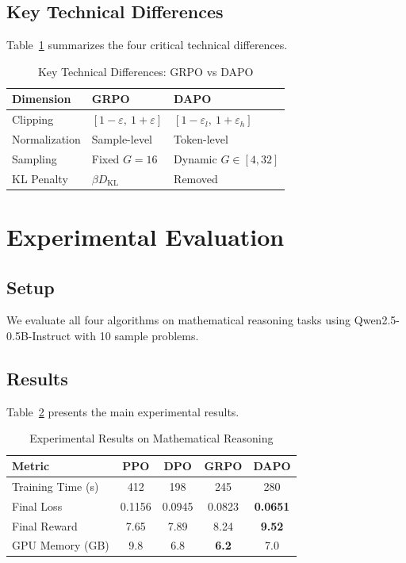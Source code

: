 \documentclass[10pt,twocolumn]{article}
\begin{document}
\subsection{Key Technical Differences}

Table~\ref{tab:tech} summarizes the four critical technical differences.

\begin{table}[ht]
\centering
\caption{Key Technical Differences: GRPO vs DAPO}
\label{tab:tech}
\begin{tabular}{lll}
\toprule
\textbf{Dimension} & \textbf{GRPO} & \textbf{DAPO} \\
\midrule
Clipping & $[1{-}\varepsilon,\ 1{+}\varepsilon]$ & $[1{-}\varepsilon_l,\ 1{+}\varepsilon_h]$ \\
Normalization & Sample-level & Token-level \\
Sampling & Fixed $G{=}16$ & Dynamic $G{\in}[4,32]$ \\
KL Penalty & $\beta D_{\text{KL}}$ & Removed \\
\bottomrule
\end{tabular}
\end{table}

\section{Experimental Evaluation}
\label{sec:exp}

\subsection{Setup}

We evaluate all four algorithms on mathematical reasoning tasks using Qwen2.5-0.5B-Instruct with 10 sample problems.

\subsection{Results}

Table~\ref{tab:results} presents the main experimental results.

\begin{table}[ht]
\centering
\caption{Experimental Results on Mathematical Reasoning}
\label{tab:results}
\begin{tabular}{lcccc}
\toprule
\textbf{Metric} & \textbf{PPO} & \textbf{DPO} & \textbf{GRPO} & \textbf{DAPO} \\
\midrule
Training Time (s) & 412 & 198 & 245 & 280 \\
Final Loss & 0.1156 & 0.0945 & 0.0823 & \textbf{0.0651} \\
Final Reward & 7.65 & 7.89 & 8.24 & \textbf{9.52} \\
GPU Memory (GB) & 9.8 & 6.8 & \textbf{6.2} & 7.0 \\
\bottomrule
\end{tabular}
\end{table}
\end{document}
